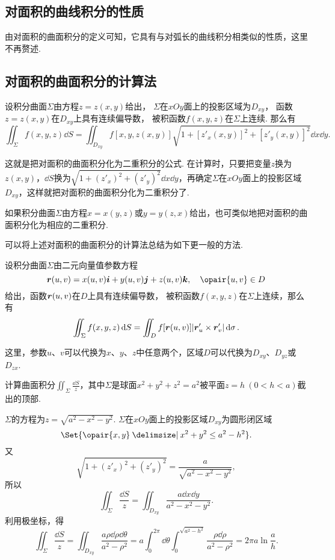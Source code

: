\subsection{对面积的曲线积分的性质}
由对面积的曲面积分的定义可知，它具有与对弧长的曲线积分相类似的性质，这里不再赘述.

\subsection{对面积的曲面积分的计算法}
\begin{theorem}
设积分曲面\(\Sigma\)由方程\(z=z(x,y)\)给出，
\(\Sigma\)在\(xOy\)面上的投影区域为\(D_{xy}\)，
函数\(z=z(x,y)\)在\(D_{xy}\)上具有连续偏导数，
被积函数\(f(x,y,z)\)在\(\Sigma\)上连续.
那么有\[
\iint_{\Sigma}{f(x,y,z)\dd{S}}
=\iint_{D_{xy}}{f[x,y,z(x,y)] \sqrt{1+[z'_x(x,y)]^2+[z'_y(x,y)]^2} \dd{x}\dd{y}}.
\]
\end{theorem}
这就是把对面积的曲面积分化为二重积分的公式.
在计算时，只要把变量\(z\)换为\(z(x,y)\)，\(\dd{S}\)换为\(\sqrt{1+(z'_x)^2+(z'_y)^2} \dd{x}\dd{y}\)，再确定\(\Sigma\)在\(xOy\)面上的投影区域\(D_{xy}\)，这样就把对面积的曲面积分化为二重积分了.

如果积分曲面\(\Sigma\)由方程\(x=x(y,z)\)或\(y=y(z,x)\)给出，也可类似地把对面积的曲面积分化为相应的二重积分.

可以将上述对面积的曲面积分的计算法总结为如下更一般的方法.
\begin{theorem}
设积分曲面\(\Sigma\)由二元向量值参数方程\[
\mat{r}(u,v) = x(u,v) \mat{i} + y(u,v) \mat{j} + z(u,v) \mat{k},
\quad \opair{u,v} \in D
\]给出，函数\(\boldsymbol{r}(u,v)\)在\(D\)上具有连续偏导数，
被积函数\(f(x,y,z)\)在\(\Sigma\)上连续，那么有\[
\iint_{\Sigma} f(x,y,z) \dd{S}
= \iint_D f[\boldsymbol{r}(u,v)] \abs{\boldsymbol{r}'_u \times \boldsymbol{r}'_v} \dd{\sigma}.
\]
\end{theorem}
这里，参数\(u\)、\(v\)可以代换为\(x\)、\(y\)、\(z\)中任意两个，区域\(D\)可以代换为\(D_{xy}\)、\(D_{yz}\)或\(D_{zx}\).

\begin{example}
计算曲面积分\(\iint_{\Sigma} \frac{\dd{S}}{z}\)，其中\(\Sigma\)是球面\(x^2+y^2+z^2=a^2\)被平面\(z = h\ (0<h<a)\)截出的顶部.
\begin{solution}
\(\Sigma\)的方程为\(z = \sqrt{a^2-x^2-y^2}\).
\(\Sigma\)在\(xOy\)面上的投影区域\(D_{xy}\)为圆形闭区域\[
\Set{\opair{x,y} \given x^2+y^2 \leq a^2-h^2}.
\]又\[
\sqrt{1+(z'_x)^2+(z'_y)^2} = \frac{a}{\sqrt{a^2-x^2-y^2}},
\]所以\[
\iint_{\Sigma} \frac{\dd{S}}{z}
= \iint_{D_{xy}} \frac{a\dd{x}\dd{y}}{a^2-x^2-y^2}.
\]利用极坐标，得\[
\iint_{\Sigma} \frac{\dd{S}}{z}
= \iint_{D_{xy}} \frac{a\rho\dd{\rho}\dd{\theta}}{a^2-\rho^2}
= a \int_0^{2\pi} \dd{\theta} \int_0^{\sqrt{a^2-h^2}} \frac{\rho\dd{\rho}}{a^2-\rho^2}
= 2\pi a \ln\frac{a}{h}.
\]
\end{solution}
\end{example}

